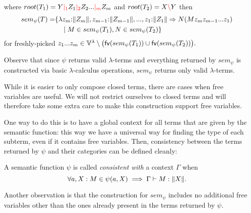 \documentclass[main.tex]{subfiles}
\begin{document}
\begin{defn}
\begin{enumerate}
\begin{center}
            \end{center}
            where $root(T_1) = Y \textcolor{red}{|_{1}} Z_1 \textcolor{red}{|_{2}} Z_2 ... \textcolor{red}{|_{m}} Z_m$ and $root(T_2) = X \textcolor{red}{\backslash} Y$ then
            \[
                \begin{split}
                    sem_{\psi}(T) =& \{
                        \lambda z_m {:} \|Z_m\|, z_{m - 1} {:} \|Z_{m - 1}\|, ..., z_1 {:} \|Z_1\| \Rightarrow
                        N ( M z_m z_{m - 1} ... z_1 ) \\
                        & \quad \mid M \in sem_{\psi}(T_1), N \in sem_{\psi}(T_2) \} \\
                \end{split}
            \]
            for freshly-picked
            $z_1 ... z_m \in \mathbb{V}^{\lambda} \setminus \big(\mathsf{fv}(sem_{\psi}(T_1)) \cup \mathsf{fv}(sem_{\psi}(T_2))\big).$
    \end{enumerate}
\end{defn}

Observe that since $\psi$ returns valid $\lambda$-terms and everything
returned by $sem_{\psi}$ is constructed via basic $\lambda$-calculus operations,
$sem_{\psi}$ returns only valid $\lambda$-terms.

While it is easier to only compose closed terms, there are cases when free
variables are useful. We will not restrict ourselves to closed terms and will
therefore take some extra care to make this construction support free variables.

One way to do this is to have a global context for all terms that are given
by the semantic function: this way we have a universal way for finding the
type of each subterm, even if it contains free variables. Then, consistency
between the terms returned by $\psi$ and their categories can be defined
cleanly:

\begin{defn}
    A semantic function $\psi$ is called \emph{consistent with} a context
    $\Gamma$ when
    \[
        \forall a, X: M \in \psi(a, X) \implies \Gamma \vdash M : \|X\|.
    \]
\end{defn}

Another observation is that the construction for $sem_{\psi}$ includes no
additional free variables other than the ones already present in the terms
returned by $\psi$.
\end{document}
